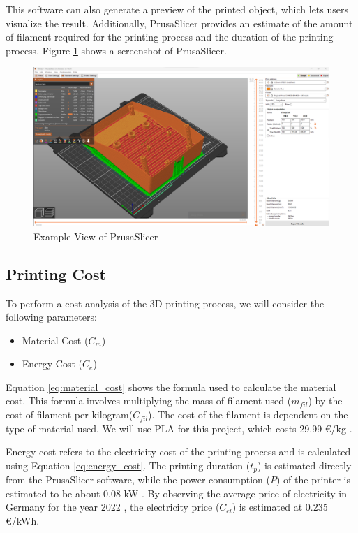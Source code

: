 This software can also generate a preview of the printed object, which lets users visualize the result. Additionally, PrusaSlicer provides an estimate of the amount of filament required for the printing process and the duration of the printing process. Figure \ref{fig:prusa_slicer} shows a screenshot of PrusaSlicer.

\begin{figure}
    \centering
    \includegraphics[width=0.8\linewidth]{texs/Part1/chapter1/image/prusaslicer.png}
    \caption{Example View of PrusaSlicer}
    \label{fig:prusa_slicer}
\end{figure}


\subsection{Printing Cost}
\label{subsec:printing_cost}

To perform a cost analysis of the 3D printing process, we will consider the following parameters:

\begin{itemize}
    \item Material Cost ($C_m$)
    \item Energy Cost ($C_e$)
\end{itemize}

Equation \ref{eq:material_cost} shows the formula used to calculate the material cost. This formula involves multiplying the mass of filament used ($m_{fil}$) by the cost of filament per kilogram($C_{fil}$). The cost of the filament is dependent on the type of material used. We will use PLA for this project, which costs 29.99 €/kg \cite{PrusaCost}.

Energy cost refers to the electricity cost of the printing process and is calculated using Equation \ref{eq:energy_cost}. The printing duration ($t_p$) is estimated directly from the PrusaSlicer software, while the power consumption ($P$) of the printer is estimated to be about 0.08 kW \cite{Prusa}. By observing the average price of electricity in Germany for the year 2022 \cite{NordPool}, the electricity price ($C_{el}$) is estimated at 0.235 €/kWh.

